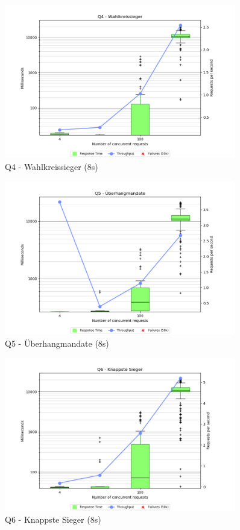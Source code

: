 \documentclass[a4paper]{scrreprt}
\begin{document}
\begin{figure}[htb!]
	\centering
	\includegraphics[width=0.9\textwidth]{images/plots_8s/Q4}
	\caption {Q4 - Wahlkreissieger (8s)}
\end{figure}

\begin{figure}[htb!]
	\centering
	\includegraphics[width=0.9\textwidth]{images/plots_8s/Q5}
	\caption {Q5 - Überhangmandate (8s)}
\end{figure}

\begin{figure}[htb!]
	\centering
	\includegraphics[width=0.9\textwidth]{images/plots_8s/Q6}
	\caption {Q6 - Knappste Sieger (8s)}
\end{figure}
\end{document}
